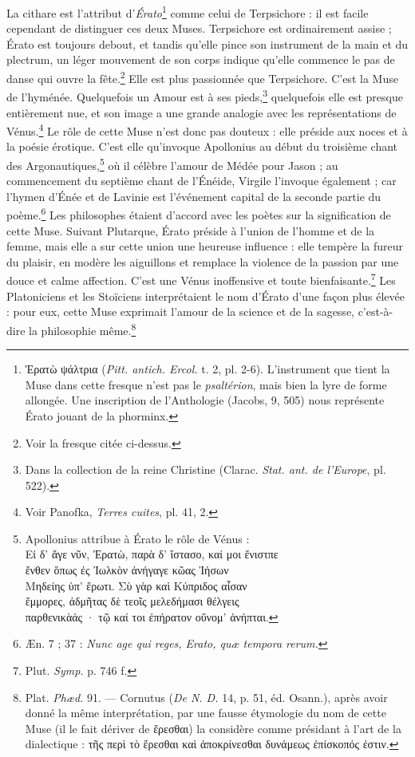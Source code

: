 \documentclass[a4paper, 11pt, oneside, polutonikogreek, french]{article}
\begin{document}
La cithare est l'attribut d'\emph{Érato}\footnote{Ἐρατὼ ψάλτρια (\emph{Pitt. antich. Ercol.} t. 2, pl. 2-6). L'instrument que tient la Muse dans cette fresque n'est pas le \emph{psaltérion}, mais bien la lyre de forme allongée. Une inscription de l'Anthologie (Jacobs, 9, 505) nous représente Érato jouant de la phorminx.} comme celui de Terpsichore : il est facile cependant de distinguer ces deux Muses. Terpsichore est ordinairement assise ; Érato est toujours debout, et tandis qu'elle pince son instrument de la main et du plectrum, un léger mouvement de son corps indique qu'elle commence le pas de danse qui ouvre la fête.\footnote{Voir la fresque citée ci-dessus.} Elle est plus passionnée que Terpsichore. C'est la Muse de l'hyménée. Quelquefois un Amour est à ses pieds,\footnote{Dans la collection de la reine Christine (Clarac. \emph{Stat. ant. de l'Europe}, pl. 522).} quelquefois elle est presque entièrement nue, et son image a une grande analogie avec les représentations de Vénus.\footnote{Voir Panofka, \emph{Terres cuites}, pl. 41, 2.} Le rôle de cette Muse n'est donc pas douteux : elle préside aux noces et à la poésie érotique. C'est elle qu'invoque Apollonius au début du troisième chant des Argonautiques,\footnote{Apollonius attribue à Érato le rôle de Vénus :\\\hspace*{5mm}Εἰ δ' ἄγε νῦν, Ἐρατὼ, παρὰ δ' ἴστασο, καί μοι ἔνιστπε\\\hspace*{5mm}ἔνθεν ὅπως ἐς Ἰωλκὸν ἀνήγαγε κῶας Ἰήσων\\\hspace*{5mm}Μηδείης ὑπ' ἔρωτι. Σὺ γὰρ καὶ Κύπριδος αἶσαν\\\hspace*{5mm}ἔμμορες, ἀδμῆτας δὲ τεοῖς μελεδήμασι θέλγεις\\\hspace*{5mm}παρθενικὰάς · τῷ καί τοι ἐπήρατον οὔνομ' ἀνήπται.} où il célèbre l'amour de Médée pour Jason ; au commencement du septième chant de l'Énéide, Virgile l'invoque également ; car l'hymen d'Énée et de Lavinie est l'événement capital de la seconde partie du poème.\footnote{Æn. 7 ; 37 : \emph{Nunc age qui reges, Erato, quæ tempora rerum.}} Les philosophes étaient d'accord avec les poètes sur la signification de cette Muse. Suivant Plutarque, Érato préside à l'union de l'homme et de la femme, mais elle a sur cette union une heureuse influence : elle tempère la fureur du plaisir, en modère les aiguillons et remplace la violence de la passion par une douce et calme affection. C'est une Vénus inoffensive et toute bienfaisante.\footnote{Plut. \emph{Symp.} p. 746 f.} Les Platoniciens et les Stoïciens interprétaient le nom d'Érato d'une façon plus élevée : pour eux, cette Muse exprimait l'amour de la science et de la sagesse, c'est-à-dire la philosophie même.\footnote{Plat. \emph{Phæd.} 91. --- Cornutus (\emph{De N. D.} 14, p. 51, éd. Osann.), après avoir donné la même interprétation, par une fausse étymologie du nom de cette Muse (il le fait dériver de ἔρεσθαι) la considère comme présidant à l'art de la dialectique : τῆς περὶ τὸ ἔρεσθαι καὶ ἀποκρίνεσθαι δυνάμεως ἐπίσκοπός ἐστιν.}
\end{document}
